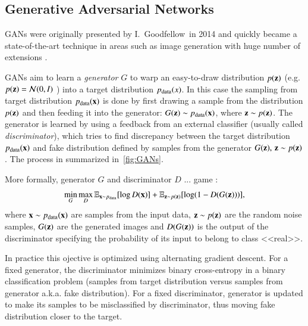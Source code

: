 \subsection{Generative Adversarial Networks}
GANs were originally presented by I.~Goodfellow~\etal in 2014 \cite{goodfellow2014generative} and quickly became a state-of-the-art technique in areas such as image generation \cite{radford2015unsupervised} with huge number of extensions \cite{1,2,3,4}.


GANs aim to learn a \textit{generator} $G$ to warp an easy-to-draw distribution $p(\mathbf{z})$ (e.g. $p(\mathbf{z}) = \mathcal{N}(0, I)$ ) into a target distribution $p_{\text{data}}(x)$. In this case the sampling from target distribution $p_{\text{data}}(\mathbf{x})$ is done by first drawing a sample from the distribution $p(\mathbf{z})$ and then feeding it into the generator: $G(\mathbf{z}) \sim p_{\text{data}}(\mathbf{x})$, where $\mathbf{z} \sim p(\mathbf{z})$. The generator is learned by using a feedback from an external classifier (usually called \textit{discriminator}), which tries to find discrepancy between the target distribution $p_{\text{data}}(\mathbf{x})$ and fake distribution defined by samples from the generator $G(\mathbf{z}),\, \mathbf{z} \sim p(\mathbf{z})$. The process in summarized in~\cref{fig:GANs}.

More formally, generator $G$ and discriminator $D$  ... game : 
\begin{equation}\label{eq:gan}
\min_G \max_D \mathbb{E}_{\mathbf{x} \sim p_{\text{data}}} [\log D(\mathbf{x})] + \mathbb{E}_{\mathbf{z} \sim p(\mathbf{z})} [\log(1 - D(G(\mathbf{z})))],
\end{equation} 
where $\mathbf{x} \sim p_{\text{data}}(\mathbf{x})$ are samples from the input data, $\mathbf{z} \sim p(\mathbf{z})$ are the random noise samples, $G(\mathbf{z})$ are the generated images and $D(G(\mathbf{z}))$ is the output of the discriminator specifying the probability of its input to belong to class <<real>>.

In practice this ojective is optimized using alternating gradient descent. For a fixed generator, the discriminator minimizes binary cross-entropy in a binary classification problem (samples from target distribution versus samples from generator a.k.a. fake distribution). For a fixed discriminator, generator is updated to make its samples to be misclassified by discriminator, thus moving fake distribution closer to the target.   



